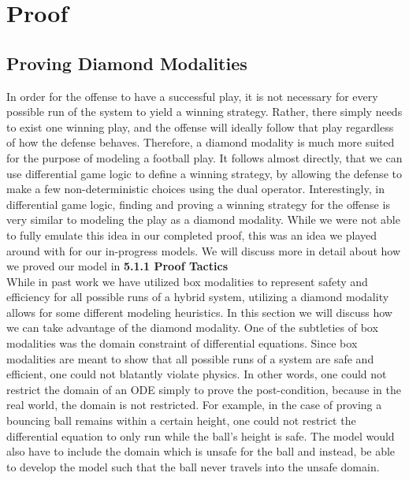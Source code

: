 \newpage


\section{Proof}

\subsection{Proving Diamond Modalities}
\quad In order for the offense to have a successful play, it is not necessary for every possible run of the system to yield a winning strategy. Rather, there simply needs to exist one winning play, and the offense will ideally follow that play regardless of how the defense behaves. Therefore, a diamond modality is much more suited for the purpose of modeling a football play. It follows almost directly, that we can use differential game logic to define a winning strategy, by allowing the defense to make a few non-deterministic choices using the dual operator. Interestingly, in differential game logic, finding and proving a winning strategy for the offense is very similar to modeling the play as a diamond modality. While we were not able to fully emulate this idea in our completed proof, this was an idea we played around with for our in-progress models. We will discuss more in detail about how we proved our model in \textbf{5.1.1 Proof Tactics} \\

While in past work we have utilized box modalities to represent safety and efficiency for all possible runs of a hybrid system, utilizing a diamond modality allows for some different modeling heuristics. In this section we will discuss how we can take advantage of the diamond modality. One of the subtleties of box modalities was the domain constraint of differential equations. Since box modalities are meant to show that all possible runs of a system are safe and efficient, one could not blatantly violate physics. In other words, one could not restrict the domain of an ODE simply to prove the post-condition, because in the real world, the domain is not restricted. For example, in the case of proving a bouncing ball remains within a certain height, one could not restrict the differential equation to only run while the ball’s height is safe. The model would also have to include the domain which is unsafe for the ball and instead, be able to develop the model such that the ball never travels into the unsafe domain. \\

